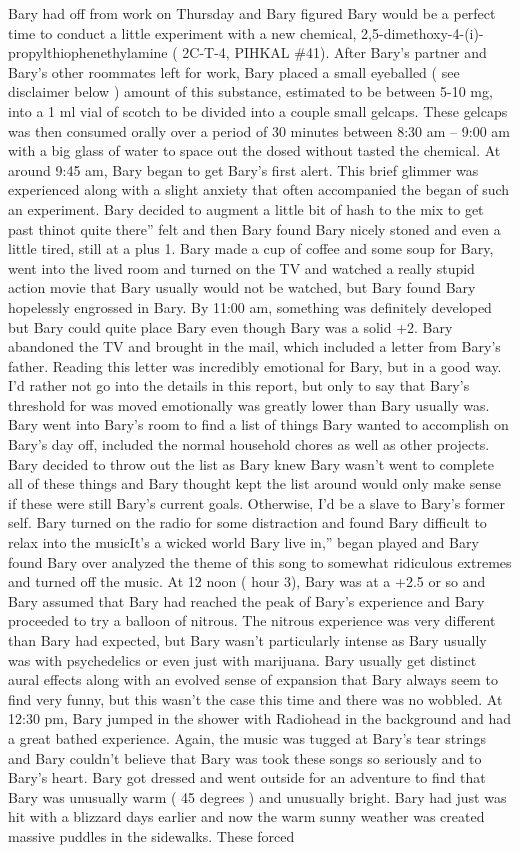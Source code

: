 \documentclass[12pt]{book}
\begin{document}
Bary had off from work on Thursday and Bary figured Bary would be a perfect time to conduct a little experiment with a new chemical, 2,5-dimethoxy-4-(i)-propylthiophenethylamine ( 2C-T-4, PIHKAL \#41). After Bary's partner and Bary's other roommates left for work, Bary placed a small eyeballed ( see disclaimer below ) amount of this substance, estimated to be between 5-10 mg, into a 1 ml vial of scotch to be divided into a couple small gelcaps. These gelcaps was then consumed orally over a period of 30 minutes between 8:30 am -- 9:00 am with a big glass of water to space out the dosed without tasted the chemical. At around 9:45 am, Bary began to get Bary's first alert. This brief glimmer was experienced along with a slight anxiety that often accompanied the began of such an experiment. Bary decided to augment a little bit of hash to the mix to get past thinot quite there'' felt and then Bary found Bary nicely stoned and even a little tired, still at a plus 1. Bary made a cup of coffee and some soup for Bary, went into the lived room and turned on the TV and watched a really stupid action movie that Bary usually would not be watched, but Bary found Bary hopelessly engrossed in Bary. By 11:00 am, something was definitely developed but Bary could quite place Bary even though Bary was a solid +2. Bary abandoned the TV and brought in the mail, which included a letter from Bary's father. Reading this letter was incredibly emotional for Bary, but in a good way. I'd rather not go into the details in this report, but only to say that Bary's threshold for was moved emotionally was greatly lower than Bary usually was. Bary went into Bary's room to find a list of things Bary wanted to accomplish on Bary's day off, included the normal household chores as well as other projects. Bary decided to throw out the list as Bary knew Bary wasn't went to complete all of these things and Bary thought kept the list around would only make sense if these were still Bary's current goals. Otherwise, I'd be a slave to Bary's former self. Bary turned on the radio for some distraction and found Bary difficult to relax into the musicIt's a wicked world Bary live in,'' began played and Bary found Bary over analyzed the theme of this song to somewhat ridiculous extremes and turned off the music. At 12 noon ( hour 3), Bary was at a +2.5 or so and Bary assumed that Bary had reached the peak of Bary's experience and Bary proceeded to try a balloon of nitrous. The nitrous experience was very different than Bary had expected, but Bary wasn't particularly intense as Bary usually was with psychedelics or even just with marijuana. Bary usually get distinct aural effects along with an evolved sense of expansion that Bary always seem to find very funny, but this wasn't the case this time and there was no wobbled. At 12:30 pm, Bary jumped in the shower with Radiohead in the background and had a great bathed experience. Again, the music was tugged at Bary's tear strings and Bary couldn't believe that Bary was took these songs so seriously and to Bary's heart. Bary got dressed and went outside for an adventure to find that Bary was unusually warm ( 45 degrees ) and unusually bright. Bary had just was hit with a blizzard days earlier and now the warm sunny weather was created massive puddles in the sidewalks. These forced 
\end{document}
